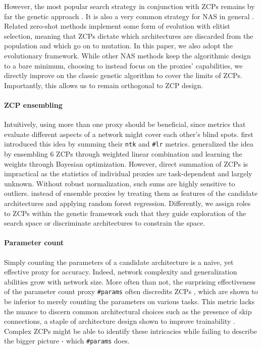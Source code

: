 \documentclass[10pt]{article} %
\begin{document}
However, the most popular search strategy in conjunction with ZCPs remains by far the genetic approach \citep{lin2021zen, li2023zico, peng2024swap}. It is also a very common strategy for NAS in general \citep{real2018regularized, ericsson2024einspace}. Related zero-shot methods implement some form of evolution with elitist selection, meaning that ZCPs dictate which architectures are discarded from the population and which go on to mutation. In this paper, we also adopt the evolutionary framework. While other NAS methods keep the algorithmic design to a bare minimum, choosing to instead focus on the proxies' capabilities, we directly improve on the classic genetic algorithm to cover the limits of ZCPs. Importantly, this allows us to remain orthogonal to ZCP design.

\paragraph{ZCP ensembling} Intuitively, using more than one proxy should be beneficial, since metrics that evaluate different aspects of a network might cover each other's blind spots. \citet{chen2021neural} first introduced this idea by summing their \texttt{ntk} and \texttt{\#lr} metrics. \citet{he2024robustifying} generalized the idea by ensembling 6 ZCPs through weighted linear combination and learning the weights through Bayesian optimization. However, direct summation of ZCPs is impractical as the statistics of individual proxies are task-dependent and largely unknown. Without robust normalization, such sums are highly sensitive to outliers. \citet{kadlecova2024surprisingly} instead of ensemble proxies by treating them as features of the candidate architectures and applying random forest regression. Differently, we assign roles to ZCPs within the genetic framework such that they guide exploration of the search space or discriminate architectures to constrain the space.

\paragraph{Parameter count} Simply counting the parameters of a candidate architecture is a naive, yet effective proxy for accuracy. Indeed, network complexity and generalization abilities grow with network size. More often than not, the surprising effectiveness of the parameter count proxy \texttt{\#params} often discredits ZCPs \citep{colin2022adeeperlook, javaheripi2022litetransformersearch}, which are shown to be inferior to merely counting the parameters on various tasks. This metric lacks the nuance to discern common architectural choices such as the presence of skip connections, a staple of architecture design shown to improve trainability \citep{he2015deep, orhan2017skip}. Complex ZCPs might be able to identify these intricacies while failing to describe the bigger picture - which \texttt{\#params} does. 
\end{document}

